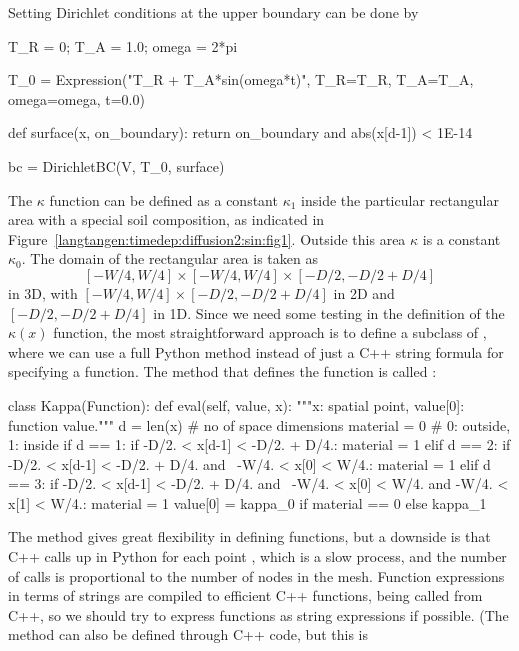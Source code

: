 Setting Dirichlet conditions at the upper boundary can be done by
\begin{python}
T_R = 0; T_A = 1.0; omega = 2*pi

T_0 = Expression("T_R + T_A*sin(omega*t)",
                 T_R=T_R, T_A=T_A, omega=omega, t=0.0)

def surface(x, on_boundary):
    return on_boundary and abs(x[d-1]) < 1E-14

bc = DirichletBC(V, T_0, surface)
\end{python}

The $\kappa$ function can be defined as a constant $\kappa_1$ inside
the particular rectangular area with a special soil composition, as
indicated in Figure~\ref{langtangen:timedep:diffusion2:sin:fig1}. Outside
this area $\kappa$ is a constant $\kappa_0$.
The domain of the rectangular area is taken as
\[ [-W/4, W/4]\times [-W/4, W/4]\times [-D/2, -D/2 + D/4]\]
in 3D, with $[-W/4, W/4]\times [-D/2, -D/2 + D/4]$ in 2D and
$[-D/2, -D/2 + D/4]$ in 1D.
Since we need some testing in the definition of the $\kappa(x)$
function, the most straightforward approach is to define a subclass
of , where we can use a full Python method instead of
just a C++ string formula for specifying a function.
The method that defines the function is called :
\begin{python}
class Kappa(Function):
    def eval(self, value, x):
        """x: spatial point, value[0]: function value."""
        d = len(x)  # no of space dimensions
        material = 0  # 0: outside, 1: inside
        if d == 1:
            if -D/2. < x[d-1] < -D/2. + D/4.:
                material = 1
        elif d == 2:
            if -D/2. < x[d-1] < -D/2. + D/4. and \
               -W/4. < x[0] < W/4.:
                material = 1
        elif d == 3:
            if -D/2. < x[d-1] < -D/2. + D/4. and \
               -W/4. < x[0] < W/4. and -W/4. < x[1] < W/4.:
                material = 1
        value[0] = kappa_0 if material == 0 else kappa_1
\end{python}
The  method gives great flexibility in defining functions, but a
downside is that C++ calls up \emp{eval} in Python for each point ,
which is a slow process, and the number of calls is proportional to the
number of nodes in the mesh.  Function expressions in terms of strings
are compiled to efficient C++ functions, being called from C++, so we
should try to express functions as string expressions if possible. (The
\emp{eval} method can also be defined through C++ code, but this is
